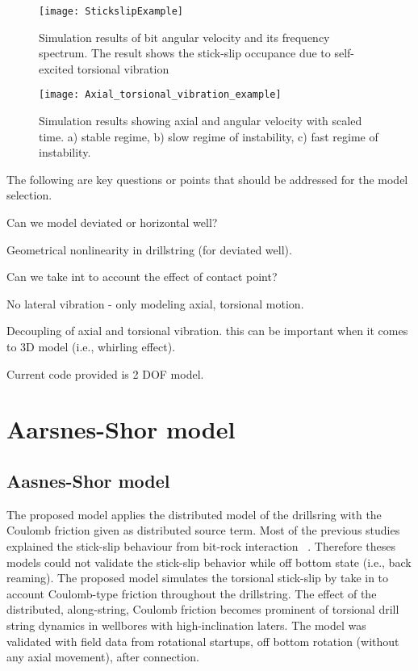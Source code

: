\begin{figure}[ht]
  \centering
  \texttt{[image: StickslipExample]}
  \caption[Simulation results of bit angular velocity and its frequency spectrum]{Simulation results of bit angular velocity and its frequency spectrum. The result shows the stick-slip occupance due to self-excited torsional vibration}\label{StickslipExample}
\end{figure}

\newpage

\begin{figure}[ht]
  \centering
  \texttt{[image: Axial\_torsional\_vibration\_example]}
  \caption[Simulation results showing axial and angular velocity with scaled time]{Simulation results showing axial and angular velocity with scaled time. a) stable regime, b) slow regime of instability, c) fast regime of instability.}\label{Axial_torsional_vibration_example}
\end{figure}

\noindent The following are key questions or points that should be addressed for the model selection.
\begin{bulletedlist}
  \item Can we model deviated or horizontal well?
  \item Geometrical nonlinearity in drillstring (for deviated well).
  \item Can we take int to account the effect of contact point?
  \item No lateral vibration - only modeling axial, torsional motion.
  \item Decoupling of axial and torsional vibration. this can be important when it comes to 3D model (i.e., whirling effect).
  \item Current code provided is 2 DOF model.
\end{bulletedlist} 

\newpage
\chapter{Aarsnes-Shor model}

\section{Aasnes-Shor model}

The proposed model applies the distributed model of the drillsring with the Coulomb friction given as distributed source term. Most of the previous studies explained the stick-slip behaviour from bit-rock interaction ~\cite{ref:germay2009a, ref:richard2007a, ref:zhang2020a}. Therefore theses models could not validate the stick-slip behavior while off bottom state (i.e., back reaming). The proposed model simulates the torsional stick-slip by take in to account Coulomb-type friction throughout the drillstring. The effect of the distributed, along-string, Coulomb friction becomes prominent of torsional drill string dynamics in wellbores with high-inclination laters. The model was validated with field data from rotational startups, off bottom rotation (without any axial movement), after connection.\\

